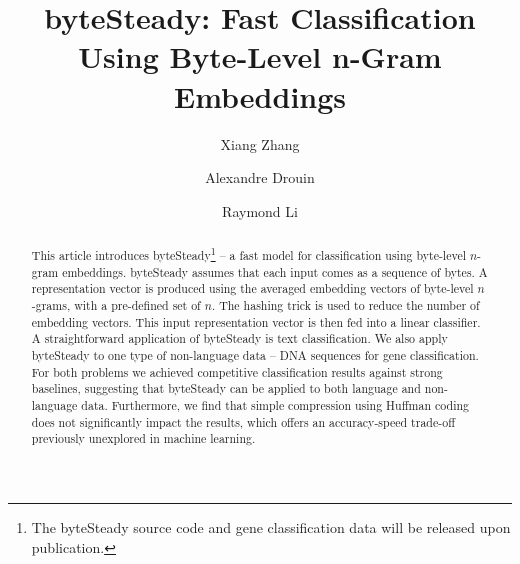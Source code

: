 \documentclass[sigconf,review, anonymous]{acmart}
\begin{document}
\title{byteSteady: Fast Classification Using Byte-Level n-Gram Embeddings}

\author{Xiang Zhang}

\author{Alexandre Drouin}

\author{Raymond Li}


\begin{abstract}
This article introduces byteSteady\footnote{The byteSteady source code and gene classification data will be released upon publication.} -- a fast model for classification using byte-level \(n\)-gram embeddings. byteSteady assumes that each input comes as a sequence of bytes. A representation vector is produced using the averaged embedding vectors of byte-level \(n\)-grams, with a pre-defined set of \(n\). The hashing trick is used to reduce the number of embedding vectors. This input representation vector is then fed into a linear classifier. A straightforward application of byteSteady is text classification. We also apply byteSteady to one type of non-language data -- DNA sequences for gene classification. For both problems we achieved competitive classification results against strong baselines, suggesting that byteSteady can be applied to both language and non-language data. Furthermore, we find that simple compression using Huffman coding does not significantly impact the results, which offers an accuracy-speed trade-off previously unexplored in machine learning.
\end{abstract}
\end{document}
